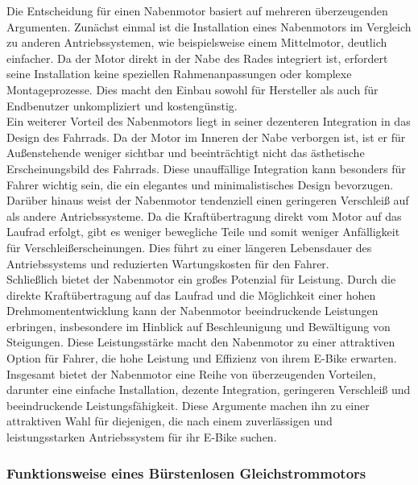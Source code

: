 Die Entscheidung für einen Nabenmotor basiert auf mehreren überzeugenden Argumenten. Zunächst einmal ist die Installation eines Nabenmotors im Vergleich zu anderen Antriebssystemen, wie beispielsweise einem Mittelmotor, deutlich einfacher. Da der Motor direkt in der Nabe des Rades integriert ist, erfordert seine Installation keine speziellen Rahmenanpassungen oder komplexe Montageprozesse. Dies macht den Einbau sowohl für Hersteller als auch für Endbenutzer unkompliziert und kostengünstig.\\

Ein weiterer Vorteil des Nabenmotors liegt in seiner dezenteren Integration in das Design des Fahrrads. Da der Motor im Inneren der Nabe verborgen ist, ist er für Außenstehende weniger sichtbar und beeinträchtigt nicht das ästhetische Erscheinungsbild des Fahrrads. Diese unauffällige Integration kann besonders für Fahrer wichtig sein, die ein elegantes und minimalistisches Design bevorzugen.\\

Darüber hinaus weist der Nabenmotor tendenziell einen geringeren Verschleiß auf als andere Antriebssysteme. Da die Kraftübertragung direkt vom Motor auf das Laufrad erfolgt, gibt es weniger bewegliche Teile und somit weniger Anfälligkeit für Verschleißerscheinungen. Dies führt zu einer längeren Lebensdauer des Antriebssystems und reduzierten Wartungskosten für den Fahrer.\\

Schließlich bietet der Nabenmotor ein großes Potenzial für Leistung. Durch die direkte Kraftübertragung auf das Laufrad und die Möglichkeit einer hohen Drehmomententwicklung kann der Nabenmotor beeindruckende Leistungen erbringen, insbesondere im Hinblick auf Beschleunigung und Bewältigung von Steigungen. Diese Leistungsstärke macht den Nabenmotor zu einer attraktiven Option für Fahrer, die hohe Leistung und Effizienz von ihrem E-Bike erwarten.\\

Insgesamt bietet der Nabenmotor eine Reihe von überzeugenden Vorteilen, darunter eine einfache Installation, dezente Integration, geringeren Verschleiß und beeindruckende Leistungsfähigkeit. Diese Argumente machen ihn zu einer attraktiven Wahl für diejenigen, die nach einem zuverlässigen und leistungsstarken Antriebssystem für ihr E-Bike suchen.\\
\subsubsection*{Funktionsweise eines Bürstenlosen Gleichstrommotors}


